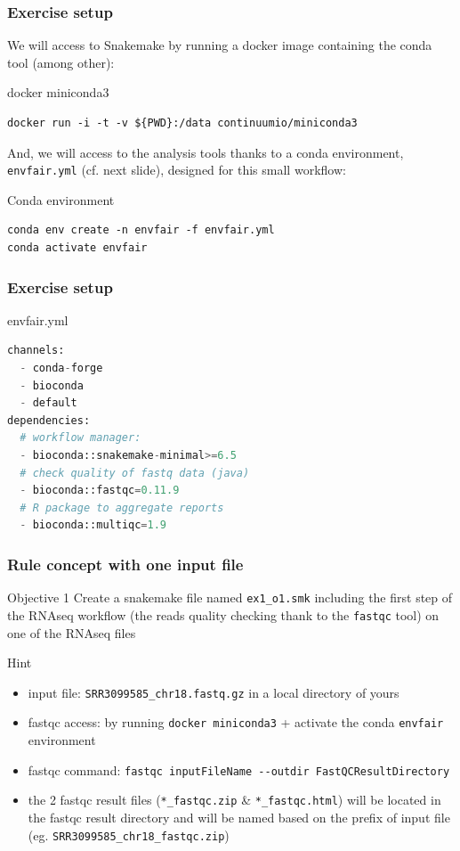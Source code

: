 \begin{frame}[containsverbatim]
\frametitle{Exercise setup}
We will access to Snakemake by running a docker image containing the conda tool (among other):
\begin{exampleblock}{docker miniconda3}
\begin{lstlisting}
docker run -i -t -v ${PWD}:/data continuumio/miniconda3
\end{lstlisting}
\end{exampleblock}
And, we will access to the analysis tools thanks to a conda environment, \verb|envfair.yml| (cf. next slide), designed for this small workflow:
\begin{exampleblock}{Conda environment}
\begin{lstlisting}
conda env create -n envfair -f envfair.yml
conda activate envfair
\end{lstlisting}
\end{exampleblock}
\end{frame}
\begin{frame}[containsverbatim]
\frametitle{Exercise setup}
\begin{exampleblock}{envfair.yml}
\begin{lstlisting}[language=python]
channels:
  - conda-forge
  - bioconda
  - default
dependencies:
  # workflow manager:
  - bioconda::snakemake-minimal>=6.5 
  # check quality of fastq data (java)
  - bioconda::fastqc=0.11.9 
  # R package to aggregate reports
  - bioconda::multiqc=1.9 
\end{lstlisting}
\end{exampleblock}
\end{frame}
\begin{frame}[containsverbatim]
\frametitle{Rule concept with one input file}
\begin{exampleblock}{Objective 1}
Create a snakemake file named \verb|ex1_o1.smk| including the first step of the RNAseq workflow (the reads quality checking thank to the \verb|fastqc| tool) on one of the RNAseq files
\end{exampleblock}
\begin{exampleblock}{Hint}
\begin{itemize}
    \item input file: \verb|SRR3099585_chr18.fastq.gz| in a local directory of yours
    \item fastqc access: by running \verb|docker miniconda3| + activate the conda \verb|envfair| environment
    \item fastqc command: \verb|fastqc inputFileName --outdir FastQCResultDirectory|
    \item the 2 fastqc result files (\verb|*_fastqc.zip| \& \verb|*_fastqc.html|) will be located in the fastqc result directory and will be named based on the prefix of input file (eg. \verb|SRR3099585_chr18_fastqc.zip|)
\end{itemize}
\end{exampleblock}
\end{frame}
